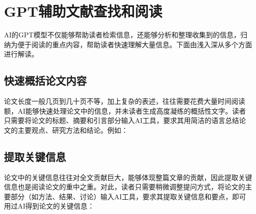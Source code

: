 \section{GPT辅助文献查找和阅读}

AI的GPT模型不仅能够帮助读者检索信息，还能够分析和整理收集到的信息，归纳为便于阅读的重点内容，帮助读者快速理解大量信息。下面由浅入深从多个方面进行解读。

\subsection{快速概括论文内容}
论文长度一般几页到几十页不等，加上复杂的表述，往往需要花费大量时间阅读额，AI能够快速处理论文中的信息，并未读者生成高度凝练的概括性文字。读者只需要将论文的标题、摘要和引言部分输入AI工具，要求其用简洁的语言总结论文的主要观点、研究方法和结论。例如：

\subsection{提取关键信息}
论文中的关键信息往往对全文贡献巨大，能够体现整篇文章的贡献，因此提取关键信息也是阅读论文的重中之重。对此，读者只需要稍微调整提问方式，将论文的主要部分（如方法、结果、讨论）输入AI工具，要求其提取关键信息和要点，即可用过AI得到论文的关键信息：

